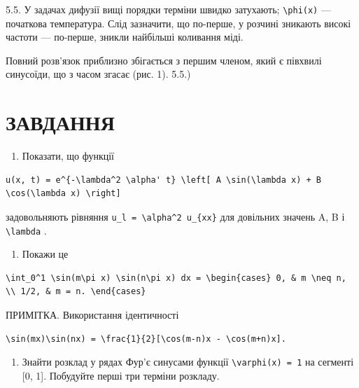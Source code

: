 \documentclass[
  ukrainian,
]{article}
\providecommand{\tightlist}{%
  \setlength{\itemsep}{0pt}\setlength{\parskip}{0pt}}
\begin{document}
5.5. У задачах дифузії вищі порядки терміни швидко затухають;
\texttt{\textbackslash{}phi(x)} --- початкова температура. Слід
зазначити, що по-перше, у розчині зникають високі частоти --- по-перше,
зникли найбільші коливання міді.

Повний розв'язок приблизно збігається з першим членом, який є півхвилі
синусоїди, що з часом згасає (рис. 1). 5.5.)

\section{ЗАВДАННЯ}\label{ux437ux430ux432ux434ux430ux43dux43dux44f-1}

\begin{enumerate}
\def\labelenumi{\arabic{enumi}.}
\tightlist
\item
  Показати, що функції
\end{enumerate}

\begin{verbatim}
u(x, t) = e^{-\lambda^2 \alpha' t} \left[ A \sin(\lambda x) + B \cos(\lambda x) \right]
\end{verbatim}

задовольняють рівняння
\texttt{u\_l\ =\ \textbackslash{}alpha\^{}2\ u\_\{xx\}} для довільних
значень A, B і \texttt{\textbackslash{}lambda} .

\begin{enumerate}
\def\labelenumi{\arabic{enumi}.}
\setcounter{enumi}{1}
\tightlist
\item
  Покажи це
\end{enumerate}

\begin{verbatim}
\int_0^1 \sin(m\pi x) \sin(n\pi x) dx = \begin{cases} 0, & m \neq n, \\ 1/2, & m = n. \end{cases}
\end{verbatim}

ПРИМІТКА. Використання ідентичності

\begin{verbatim}
\sin(mx)\sin(nx) = \frac{1}{2}[\cos(m-n)x - \cos(m+n)x].
\end{verbatim}

\begin{enumerate}
\def\labelenumi{\arabic{enumi}.}
\setcounter{enumi}{2}
\tightlist
\item
  Знайти розклад у рядах Фур'є синусами функції
  \texttt{\textbackslash{}varphi(x)\ =\ 1} на сегменті {[}0, 1{]}.
  Побудуйте перші три терміни розкладу.
\end{enumerate}
\end{document}
